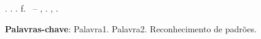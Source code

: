 
\begin{resumo}[RESUMO]
\begin{SingleSpacing}

\imprimirautorcitacao. \imprimirtitulo. \imprimirdata. \pageref {LastPage} f. \imprimirprojeto\ – \imprimirprograma, \imprimirinstituicao. \imprimirlocal, \imprimirdata.\\

\lipsum[1] %

\textbf{Palavras-chave}: Palavra1. Palavra2. Reconhecimento de padrões. 
\end{SingleSpacing}
\end{resumo}


